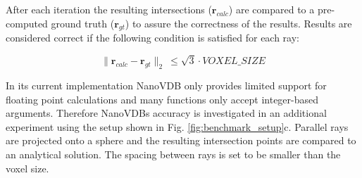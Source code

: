 After each iteration the resulting intersections ($\mathbf{r}_{calc}$) are compared to a pre-computed ground truth ($\mathbf{r}_{gt}$) to assure the correctness of the results.
Results are considered correct if the following condition is satisfied for each ray:

\begin{equation}
	\lVert \mathbf{r}_{calc} - \mathbf{r}_{gt} \lVert _2 \:  \leq \sqrt{3} \cdot VOXEL\_SIZE
\end{equation}

In its current implementation NanoVDB only provides limited support for floating point calculations and  many functions only accept integer-based arguments.
Therefore NanoVDBs accuracy is investigated in an additional experiment using the setup shown in Fig. \ref{fig:benchmark_setup}c.
Parallel rays are projected onto a sphere and the resulting intersection points are compared to an analytical solution.
The spacing between rays is set to be smaller than the voxel size.

